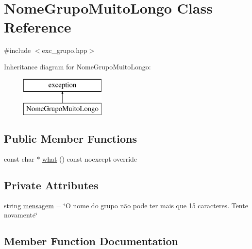 \hypertarget{classNomeGrupoMuitoLongo}{}\section{Nome\+Grupo\+Muito\+Longo Class Reference}
\label{classNomeGrupoMuitoLongo}


{\ttfamily \#include $<$exc\+\_\+grupo.\+hpp$>$}

Inheritance diagram for Nome\+Grupo\+Muito\+Longo\+:\begin{figure}[H]
\begin{center}
\leavevmode
\includegraphics[height=2.000000cm]{classNomeGrupoMuitoLongo}
\end{center}
\end{figure}
\subsection*{Public Member Functions}
\begin{DoxyCompactItemize}
\item 
const char $\ast$ \hyperlink{classNomeGrupoMuitoLongo_a2b75f8838ba032215a34cba6cf9f52b7}{what} () const noexcept override
\end{DoxyCompactItemize}
\subsection*{Private Attributes}
\begin{DoxyCompactItemize}
\item 
string \hyperlink{classNomeGrupoMuitoLongo_a41c3c15095f9045cad1563e8f2257bbc}{mensagem} = \char`\"{}O nome do grupo não pode ter mais que 15 caracteres. Tente novamente\char`\"{}
\end{DoxyCompactItemize}


\subsection{Member Function Documentation}
\mbox{\label{classNomeGrupoMuitoLongo_a2b75f8838ba032215a34cba6cf9f52b7}} 
